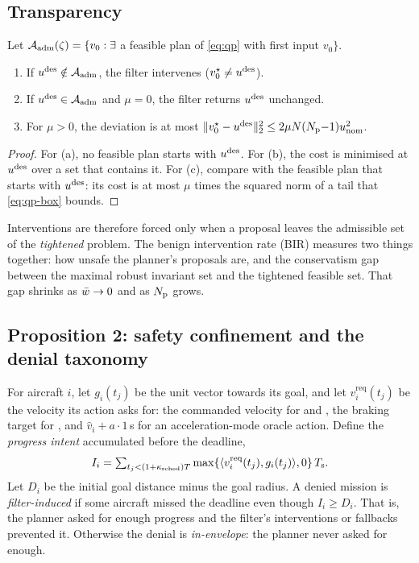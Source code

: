 \subsection{Transparency}
\begin{lemma}[Transparency]\label{lem:transparent}
Let $\mathcal{A}_{\mathrm{adm}}(\zeta)=\{v_0:\exists$ a feasible plan of \eqref{eq:qp} with first
input $v_0\}$.
\begin{enumerate}[label=(\alph*)]
\item If $u^{\mathrm{des}}\notin\mathcal{A}_{\mathrm{adm}}$, the filter intervenes ($v^\star_0\neq u^{\mathrm{des}}$).
\item If $u^{\mathrm{des}}\in\mathcal{A}_{\mathrm{adm}}$ and $\mu=0$, the filter returns $u^{\mathrm{des}}$ unchanged.
\item For $\mu>0$, the deviation is at most
  $\|v^\star_0-u^{\mathrm{des}}\|_2^2\le2\mu N(N_{\mathrm{p}}{-}1)u_{\mathrm{nom}}^2$.
\end{enumerate}
\end{lemma}
\begin{proof}
For (a), no feasible plan starts with $u^{\mathrm{des}}$. For (b), the cost is minimised
at $u^{\mathrm{des}}$ over a set that contains it. For (c), compare with the feasible plan
that starts with $u^{\mathrm{des}}$: its cost is at most $\mu$ times the squared norm of a
tail that \eqref{eq:qp-box} bounds.
\end{proof}

Interventions are therefore forced only when a proposal leaves the
admissible set of the \emph{tightened} problem. The benign intervention rate
(BIR) measures two things together: how unsafe the planner's proposals are,
and the conservatism gap between the maximal robust invariant set and the
tightened feasible set. That gap shrinks as $\bar w\to0$ and as $N_{\mathrm{p}}$ grows.

\subsection{Proposition 2: safety confinement and the denial taxonomy}
For aircraft $i$, let $g_i(t_j)$ be the unit vector towards its goal, and let
$v^{\mathrm{req}}_i(t_j)$ be the velocity its action asks for: the commanded
velocity for  and , the braking target for
, and $\hat v_i+a\cdot1$\,s for an acceleration-mode oracle
action. Define the \emph{progress intent} accumulated before the deadline,
\begin{equation}\label{eq:intent}
I_i=\textstyle\sum_{t_j<(1+\kappa_{\mathrm{sched}})T}\max\{\langle v^{\mathrm{req}}_i(t_j),g_i(t_j)\rangle,0\}\,T_{\mathrm{s}} .
\end{equation}
Let $D_i$ be the initial goal distance minus the goal radius. A denied
mission is \emph{filter-induced} if some aircraft missed the deadline even
though $I_i\ge D_i$. That is, the planner asked for enough progress and the
filter's interventions or fallbacks prevented it. Otherwise the denial is
\emph{in-envelope}: the planner never asked for enough.

